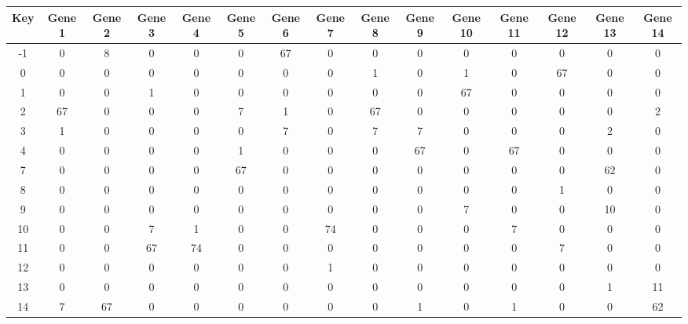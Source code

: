 \begin{tabular}{|c|c|c|c|c|c|c|c|c|c|c|c|c|c|c|}
\hline
Key & Gene 1 & Gene 2 & Gene 3 & Gene 4 & Gene 5 & Gene 6 & Gene 7 & Gene 8 & Gene 9 & Gene 10 & Gene 11 & Gene 12 & Gene 13 & Gene 14 \\
\hline
-1 & 0 & 8 & 0 & 0 & 0 & 67 & 0 & 0 & 0 & 0 & 0 & 0 & 0 & 0 \\
0 & 0 & 0 & 0 & 0 & 0 & 0 & 0 & 1 & 0 & 1 & 0 & 67 & 0 & 0 \\
1 & 0 & 0 & 1 & 0 & 0 & 0 & 0 & 0 & 0 & 67 & 0 & 0 & 0 & 0 \\
2 & 67 & 0 & 0 & 0 & 7 & 1 & 0 & 67 & 0 & 0 & 0 & 0 & 0 & 2 \\
3 & 1 & 0 & 0 & 0 & 0 & 7 & 0 & 7 & 7 & 0 & 0 & 0 & 2 & 0 \\
4 & 0 & 0 & 0 & 0 & 1 & 0 & 0 & 0 & 67 & 0 & 67 & 0 & 0 & 0 \\
7 & 0 & 0 & 0 & 0 & 67 & 0 & 0 & 0 & 0 & 0 & 0 & 0 & 62 & 0 \\
8 & 0 & 0 & 0 & 0 & 0 & 0 & 0 & 0 & 0 & 0 & 0 & 1 & 0 & 0 \\
9 & 0 & 0 & 0 & 0 & 0 & 0 & 0 & 0 & 0 & 7 & 0 & 0 & 10 & 0 \\
10 & 0 & 0 & 7 & 1 & 0 & 0 & 74 & 0 & 0 & 0 & 7 & 0 & 0 & 0 \\
11 & 0 & 0 & 67 & 74 & 0 & 0 & 0 & 0 & 0 & 0 & 0 & 7 & 0 & 0 \\
12 & 0 & 0 & 0 & 0 & 0 & 0 & 1 & 0 & 0 & 0 & 0 & 0 & 0 & 0 \\
13 & 0 & 0 & 0 & 0 & 0 & 0 & 0 & 0 & 0 & 0 & 0 & 0 & 1 & 11 \\
14 & 7 & 67 & 0 & 0 & 0 & 0 & 0 & 0 & 1 & 0 & 1 & 0 & 0 & 62 \\
\hline
\end{tabular}